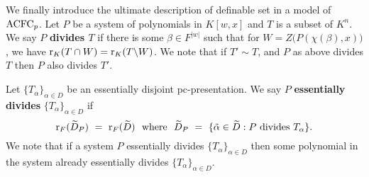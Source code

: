 \noindent
We finally introduce the ultimate description of definable set in a model of $\mathrm{ACFC}_p$. Let $P$ be a system of polynomials in $ K[w, x]$ and $T$ is a subset of $K^n$. We say $P$ {\bf divides $T$} if there is some $\beta \in F^{|w|}$  such that for $W = Z\big(P( \chi(\beta),x)\big)$, we have $\mathrm{r}_K(T \cap W) = \mathrm{r}_K(T \backslash W)$. We note that if $T' \sim T$, and $P$ as above divides $T$ then $P$ also divides $T'$.
\begin{comment}
We say $T$ is $K$-indivisible if no polynomial $P \in K[w, x]$ divides $T$. It follows that if $V$ is the closure of $T$ in the $K$-topology, then $T$ is $K$-indivisible if and only if $V$ has one single irreducible component of dimension $\mr_K(T)$ in the $K$-topology
\end{comwith ment}








For a system $P$ of polynomials in $K[w, x]$ with $w \in \vartu$ and $x \in \vart{n}$, let $\widetilde{D}_P$ be the set of $\tilde{\alpha} \in \widetilde{D} $ such that for an arbitrary representative $\alpha$ of $\tilde{\alpha}$, $P$ divides $T_\alpha$. The pc-presentation $ \{ T_\alpha\}_{ \alpha \in D}$ is {\bf geometric} if for an arbitrary $P$ of polynomials as above, we have $\mr_F( \widetilde{D}_P)< \mr_F( \widetilde{D})$. It is easy to see that the above definition does not change if we add the assumption that $P$ consists of a single polynomial. 

Keep the notation as in the previous paragraph and suppose further that $D$ is finite, $X =\bigcup_{\alpha \in D} T_\alpha$ and for each $\alpha \in D$, $T_\alpha$ is algebraic. Then  $ \{ T_\alpha\}_{ \alpha \in D}$ is geometric if and only if $ \{ T_\alpha\}_{ \alpha \in D}$ is a decomposition of $X$ into algebraic sets such that for all $\alpha \in D$, $\mr_K(T_\alpha) =\mr_K(X)$ implies $\md_K(T_\alpha)=1$. Hence, the notion of geometric pc-presentation of a definable set is almost a generalization of the notion of decomposition of a constructible set into quasi-affine varieties. We could have refined the notion of geometric presentation so that we can delete the word ``almost'' in the preceding statement. However, we leave this for the interested reader as this will require much more effort and not needed in the subsequent developments.
\end{comment}
Let $ \{ T_\alpha\}_{ \alpha \in D}$ be an essentially disjoint pc-presentation. 
We say $P$ {\bf essentially divides} $ \{ T_\alpha\}_{ \alpha \in D}$ if  
$$\mathrm{r}_F( \widetilde{D}_P)\ =\ \mathrm{r}_F( \widetilde{D}) \ \text{ where }\ \widetilde{D}_P\ =\ \{ \tilde{\alpha} \in  \widetilde{D} : P \text{ divides } T_\alpha  \}  .$$ 
We note that if a system $P$ essentially divides $ \{ T_\alpha\}_{ \alpha \in D}$ then some polynomial in the system already essentially divides $ \{ T_\alpha\}_{ \alpha \in D}$. 


